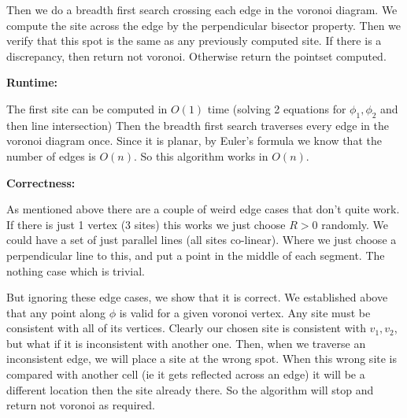 \documentclass[11pt]{article}
\begin{document}
Then we do a breadth first search crossing each edge in the voronoi diagram. 
We compute the site across the edge by the perpendicular bisector property. 
Then we verify that this spot is the same as any previously computed site.
If there is a discrepancy, then return not voronoi.
Otherwise return the pointset computed. 


\textbf{Runtime: }

The first site can be computed in $O(1)$ time (solving 2 equations for $\phi_1, \phi_2$ and then line intersection)
Then the breadth first search traverses every edge in the voronoi diagram once. Since it is planar,
by Euler's formula we know that the number of edges is $O(n)$. So this algorithm works in $O(n)$.


\textbf{Correctness: }

As mentioned above there are a couple of weird edge cases that don't quite work.
If there is just 1 vertex (3 sites) this works we just choose $R > 0$ randomly.
We could have a set of just parallel lines (all sites co-linear). Where we just choose a perpendicular
line to this, and put a point in the middle of each segment. 
The nothing case which is trivial. 

But ignoring these edge cases, we show that it is correct. 
We established above that any point along $\phi$ is valid for a given voronoi vertex.
Any site must be consistent with all of its vertices. 
Clearly our chosen site is consistent with $v_1, v_2$, but what if it is inconsistent with another one.
Then, when we traverse an inconsistent edge, we will place a site at the wrong spot. 
When this wrong site is compared with another cell (ie it gets reflected across an edge)
it will be a different location then the site already there. So the algorithm will stop and return not voronoi
as required. 
\end{document}
